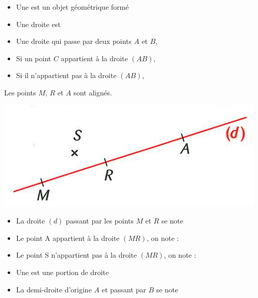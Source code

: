 \begin{mydefs}
	
	\begin{itemize}
		\item Une  est un objet géométrique formé \\%
		\item Une droite est %
		\item Une droite qui passe par deux points $A$ et $B$, \\%
		\item Si un point $C$ appartient à la droite $(AB)$, \\ %
		\item Si il n'appartient pas à la droite $(AB)$, %
	\end{itemize}
\end{mydefs}

\newpage

\begin{myex}
	Les points $M$, $R$ et $A$ sont alignés.
	\begin{center}
		\includegraphics[scale=0.55]{img/droite1}
	\end{center}

	\begin{itemize}
		\item La droite $(d)$ passant par les points $M$ et $R$ se note 
		\item Le point A appartient à la droite $(MR)$, on note :
		\item Le point S n'appartient pas à la droite $(MR)$, on note :
	\end{itemize}
\end{myex}

\begin{mydef}
	\begin{itemize}
		\item Une  est une portion de droite %
		
		\item La demi-droite d'origine $A$ et passant par $B$ se note%
	\end{itemize}
	
\end{mydef}


